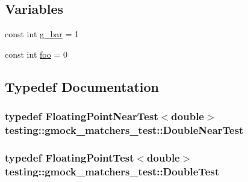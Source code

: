\subsection*{Variables}
\begin{DoxyCompactItemize}
\item 
const int \hyperlink{namespacetesting_1_1gmock__matchers__test_a55dcc962203a3a3361d2e7e00ed99b4d}{g\+\_\+bar} = 1
\item 
const int \hyperlink{namespacetesting_1_1gmock__matchers__test_a3536e68112ffbb1f76887cd15bb45c15}{foo} = 0
\end{DoxyCompactItemize}


\subsection{Typedef Documentation}
\subsubsection[{\texorpdfstring{Double\+Near\+Test}{DoubleNearTest}}]{\setlength{\rightskip}{0pt plus 5cm}typedef {\bf Floating\+Point\+Near\+Test}$<$double$>$ {\bf testing\+::gmock\+\_\+matchers\+\_\+test\+::\+Double\+Near\+Test}}\hypertarget{namespacetesting_1_1gmock__matchers__test_aea537d0183ccc65b5c49a75d711993c8}{}\label{namespacetesting_1_1gmock__matchers__test_aea537d0183ccc65b5c49a75d711993c8}
\subsubsection[{\texorpdfstring{Double\+Test}{DoubleTest}}]{\setlength{\rightskip}{0pt plus 5cm}typedef {\bf Floating\+Point\+Test}$<$double$>$ {\bf testing\+::gmock\+\_\+matchers\+\_\+test\+::\+Double\+Test}}\hypertarget{namespacetesting_1_1gmock__matchers__test_a944cdd366ed240f29ae8e3ebc753ad5c}{}\label{namespacetesting_1_1gmock__matchers__test_a944cdd366ed240f29ae8e3ebc753ad5c}
